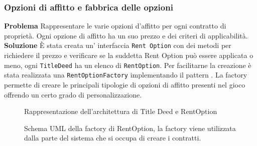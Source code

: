 \subsubsection{Opzioni di affitto e fabbrica delle opzioni}
\textbf{Problema}\newline
Rappresentare le varie opzioni d'affitto per ogni contratto di proprietà. Ogni
opzione di affitto ha un suo prezzo e dei criteri di applicabilità.\newline
\textbf{Soluzione}\newline
È stata creata un' interfaccia \texttt{Rent Option} 
con dei metodi per richiedere il prezzo e verificare se la suddetta Rent Option può essere applicata o meno, 
ogni \texttt{TitleDeed} ha un elenco di \texttt{RentOption}.\newline
Per facilitarne la creazione è stata realizzata una 
\texttt{RentOptionFactory} implementando il pattern . 
La factory permette di creare le principali tipologie di opzioni di affitto presenti nel gioco 
offrendo un certo grado di personalizzazione.\newline
\begin{figure}[H]
    \centering
    \caption{Rappresentazione dell'architettura di Title Deed e RentOption}
	\label{img:RentOption}
\end{figure}
\begin{figure}[H]
    \centering
    \caption{Schema UML della factory di RentOption, la factory viene utilizzata dalla parte del sistema che si occupa di creare i contratti.}
	\label{img:RentOptionFactory}
\end{figure}
